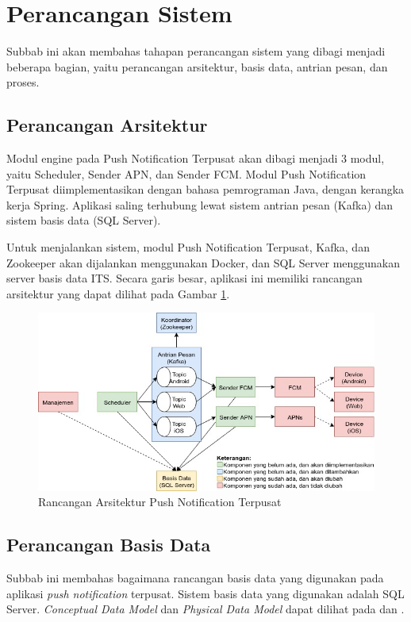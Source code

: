\section{Perancangan Sistem}
\par Subbab ini akan membahas tahapan perancangan sistem yang dibagi menjadi beberapa bagian, yaitu perancangan arsitektur, basis data, antrian pesan, dan proses.

\subsection{Perancangan Arsitektur} \label{s:perancangan_arsitektur}
\par Modul engine pada Push Notification Terpusat akan dibagi menjadi 3 modul, yaitu Scheduler, Sender APN, dan Sender FCM. Modul Push Notification Terpusat diimplementasikan dengan bahasa pemrograman Java, dengan kerangka kerja Spring. Aplikasi saling terhubung lewat sistem antrian pesan (Kafka) dan sistem basis data (SQL Server).
\par Untuk menjalankan sistem, modul Push Notification Terpusat, Kafka, dan Zookeeper akan dijalankan menggunakan Docker, dan SQL Server menggunakan server basis data ITS. Secara garis besar, aplikasi ini memiliki rancangan arsitektur yang dapat dilihat pada Gambar \ref{img:arsitektur_baru}.
\begin{figure}[H]
    \includegraphics[width=1\textwidth]{bab3/img/arsitektur-push_notification_terpusat_baru.jpg}
    \caption{Rancangan Arsitektur Push Notification Terpusat} \label{img:arsitektur_baru}
\end{figure}

\subsection{Perancangan Basis Data}
\par Subbab ini membahas bagaimana rancangan basis data yang digunakan pada aplikasi \textit{push notification} terpusat. Sistem basis data yang digunakan adalah SQL Server. \textit{Conceptual Data Model} dan \textit{Physical Data Model} dapat dilihat pada  dan .

